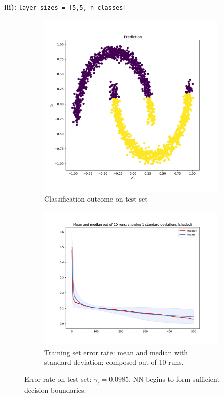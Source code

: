 \documentclass[12pt]{article}
\begin{document}
\newpage
\enlargethispage{10\baselineskip}
\noindent \textbf{iii):} \texttt{layer\_sizes = [5,5, n\_classes]} \\
\begin{figure}[htbp]
\captionsetup[subfigure]{labelformat=empty}
\centering
	\begin{subfigure}{.48\textwidth}
	\centering
	\includegraphics[scale=0.30]{pics/Prediction_iii}
	\caption{Classification outcome on test set}
	\label{fig:iii_a}
	\end{subfigure}
	\begin{subfigure}{.48\textwidth}
	\centering
	\includegraphics[scale=0.30]{pics/iii_ens}
	\caption{Training set error rate: mean and median with standard deviation; composed out of 10 runs.}
	\label{fig:iii_b}
	\end{subfigure}
\caption{Error rate on test set: $\gamma_t = 0.0985$. NN begins to form sufficient decision boundaries.}
\label{fig:res_iii}
\end{figure}
\end{document}
